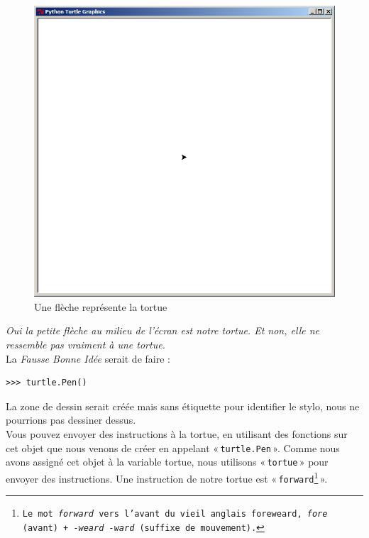 \begin{figure}[ht!]
\centering
\includegraphics[scale=0.4]{images/turtle_debut.png}
\caption{Une flèche représente la tortue}
\label{fig:turtledebut}
\end{figure}

\emph{Oui la petite flèche au milieu de l'écran est notre tortue. Et non, elle ne ressemble pas vraiment à une tortue.}\\

La \emph{Fausse Bonne Idée} serait de faire :

\begin{Verbatim}[frame=single,rulecolor=\color{red}, label=erreur]
>>> turtle.Pen()
\end{Verbatim}

La zone de dessin serait créée mais sans étiquette pour identifier le stylo, nous ne pourrions pas dessiner dessus.\\


Vous pouvez envoyer des instructions à la tortue, en utilisant des fonctions sur cet objet que nous venons de créer en appelant « \texttt{turtle.Pen} ». Comme nous avons assigné cet objet à la variable tortue, nous utilisons « \texttt{tortue} » pour envoyer des instructions. Une instruction de notre tortue est « \texttt{forward\footnote{Le mot \emph{forward} vers l'avant du vieil anglais foreweard,  \emph{fore} (avant) + \emph{-weard -ward} (suffixe de mouvement).}} ».

